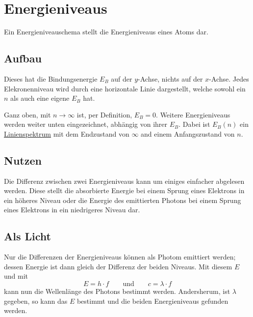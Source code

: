 \documentclass{article}
\begin{document}
  
\section{Energieniveaus}
Ein Energieniveauschema stellt die Energieniveaus eines Atoms dar.
 
\subsection{Aufbau} 
\begin{minipage}{\dimexpr\linewidth - 6cm}
Dieses hat die Bindungsenergie $E_B$ auf der $y$-Achse, nichts auf der $x$-Achse. Jedes Elekronenniveau wird durch eine horizontale Linie dargestellt, welche sowohl ein $n$ als auch eine eigene $E_B$ hat.
 
Ganz oben, mit $n \to \infty$ ist, per Definition, $E_B=0$. Weitere Energieniveaus werden weiter unten eingezeichnet, abhängig von ihrer $E_B$. Dabei ist $E_B(n)$ ein \hyperref[Das Linienspektrum von Wasserstoffatomen]{Linienspektrum} mit dem Endzustand von $\infty$ and einem Anfangszustand von $n$.
 
\subsection{Nutzen}
Die Differenz zwischen zwei Energieniveaus kann um einiges einfacher abgelesen werden. Diese stellt die absorbierte Energie bei einem Sprung eines Elektrons in ein höheres Niveau oder die Energie des emittierten Photons bei einem Sprung eines Elektrons in ein niedrigeres Niveau dar.
\end{minipage}
\hfill
\begin{minipage}{6cm}
 \center
\end{minipage}
  
\subsection{Als Licht}
Nur die Differenzen der Energieniveaus können als Photom emittiert werden; dessen Energie ist dann gleich der Differenz der beiden Niveaus. Mit diesem $E$ und mit
\[
 E = h \cdot f
 \qquad \text{und} \qquad
 c = \lambda \cdot f 
\]
kann nun die Wellenlänge des Photons bestimmt werden. Andersherum, ist $\lambda$ gegeben, so kann das $E$ bestimmt und die beiden Energieniveaus gefunden werden.
\end{document}

